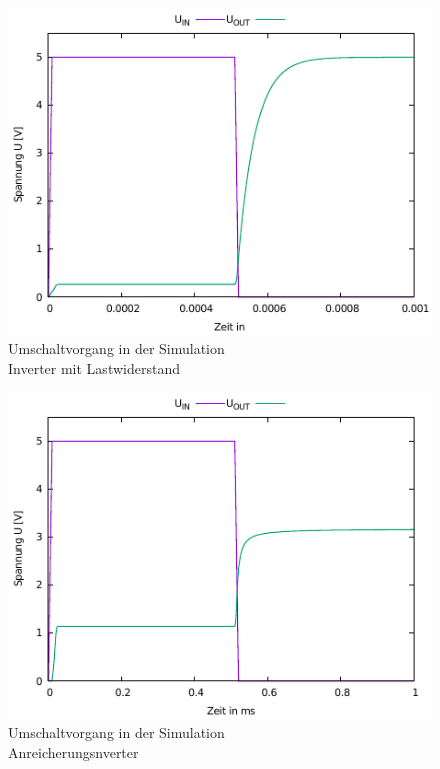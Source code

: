 \documentclass[11pt, a4paper]{article}
\begin{document}
\begin{figure}
    \centering
    \includegraphics[width=\linewidth]{simTimeLast.pdf}
    \caption{Umschaltvorgang in der Simulation \\ Inverter mit Lastwiderstand}
    \label{simTimeLast}
\end{figure}
\begin{figure}
    \centering
    \includegraphics[width=\linewidth]{simTimeAnreicherung.pdf}
    \caption{Umschaltvorgang in der Simulation \\ Anreicherungsnverter}
    \label{simTimeAnreicherung}
\end{figure}
\end{document}
